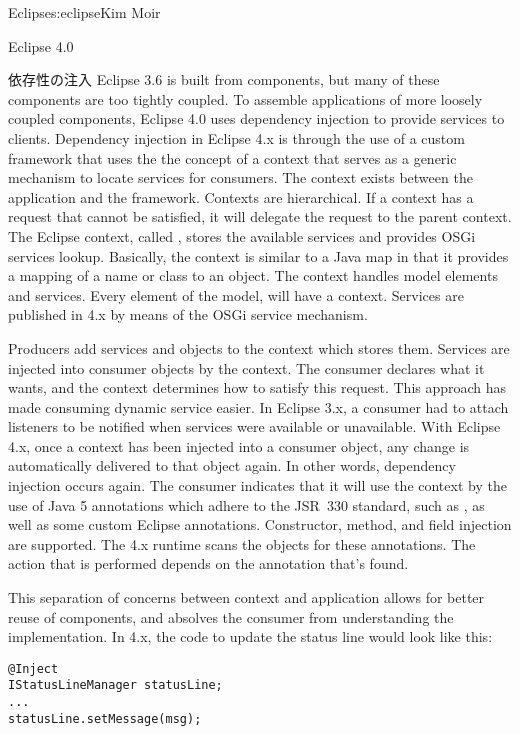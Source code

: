 \begin{aosachapter}{Eclipse}{s:eclipse}{Kim Moir}
\begin{aosasect1}{Eclipse 4.0}
\begin{aosasect2}{依存性の注入}
Eclipse 3.6 is built from components, but many of these components are
too tightly coupled. To assemble applications of more loosely coupled
components, Eclipse 4.0 uses dependency injection to provide services
to clients. Dependency injection in Eclipse 4.x is through the use of
a custom framework that uses the the concept of a context that serves
as a generic mechanism to locate services for consumers.  The context
exists between the application and the framework. Contexts are
hierarchical. If a context has a request that cannot be satisfied,
it will delegate the request to the parent context. The Eclipse
context, called , stores the available services and
provides OSGi services lookup.  Basically, the context is similar to a
Java map in that it provides a mapping of a name or class to an
object.  The context handles model elements and services.  Every
element of the model, will have a context. Services are published in
4.x by means of the OSGi service mechanism.


Producers add services and objects to the context which stores them.
Services are injected into consumer objects by the context. The
consumer declares what it wants, and the context determines how to
satisfy this request. This approach has made consuming dynamic service
easier. In Eclipse 3.x, a consumer had to attach listeners to be
notified when services were available or unavailable. With Eclipse
4.x, once a context has been injected into a consumer object, any
change is automatically delivered to that object again. In other
words, dependency injection occurs again. The consumer indicates that
it will use the context by the use of Java 5 annotations which adhere
to the JSR~330 standard, such as , as well as some
custom Eclipse annotations. Constructor, method, and field injection
are supported.  The 4.x runtime scans the objects for these
annotations. The action that is performed depends on the annotation
that's found.

This separation of concerns between context and application allows for
better reuse of components, and absolves the consumer from
understanding the implementation.  In 4.x, the code to update the
status line would look like this:

\begin{verbatim}
@Inject
IStatusLineManager statusLine;
...
statusLine.setMessage(msg);
\end{verbatim}


\end{aosasect2}
\end{aosasect1}
\end{aosachapter}
